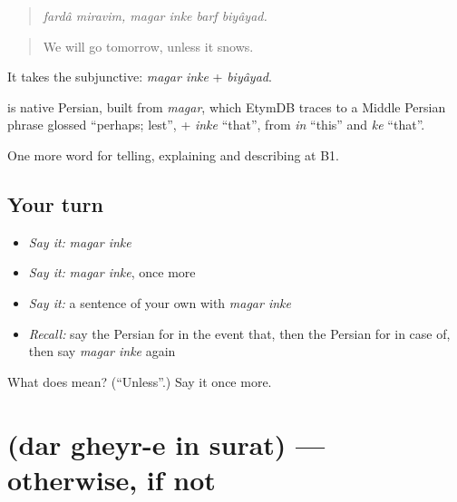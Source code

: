 \begin{quote}
\emph{fardâ miravim, magar inke barf biyâyad.}
\end{quote}

\begin{quote}
We will go tomorrow, unless it snows.
\end{quote}

It takes the subjunctive: \emph{magar inke} + \emph{biyâyad}.

\begin{cousinweb}
\textbf{ } is native Persian, built from \emph{magar}, which EtymDB traces to a Middle Persian phrase glossed \textquotedblleft{}perhaps; lest\textquotedblright{}, + \emph{inke} \textquotedblleft{}that\textquotedblright{}, from \emph{in} \textquotedblleft{}this\textquotedblright{} and \emph{ke} \textquotedblleft{}that\textquotedblright{}.
\end{cousinweb}

\begin{grammarlens}[title={What you've built}]
One more word for telling, explaining and describing at B1.
\end{grammarlens}

\subsection*{Your turn}
\begin{itemize}
\raggedright
  \item \emph{Say it:} \emph{magar inke}
  \item \emph{Say it:} \emph{magar inke}, once more
  \item \emph{Say it:} a sentence of your own with \emph{magar inke}
  \item \emph{Recall:} say the Persian for in the event that, then the Persian for in case of, then say \emph{magar inke} again
\end{itemize}

\begin{tcolorbox}[breakable,colback=teal!4,colframe=teal!35!black,title={Before you move on}]
What does   mean? (\textquotedblleft{}Unless\textquotedblright{}.) Say it once more.
\end{tcolorbox}
\section[\texorpdfstring{\fa{در} \fa{غیر} \fa{این} \fa{صورت} (dar gheyr-e in surat)}{در غیر این صورت (dar gheyr-e in surat)}]{    (dar gheyr-e in surat) — otherwise, if not}

